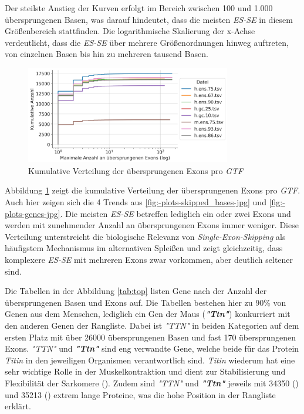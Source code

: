 \documentclass[12pt]{article}
\begin{document}
Der steilste Anstieg der Kurven erfolgt im Bereich zwischen 100 und 1.000 übersprungenen Basen, was darauf hindeutet,
dass die meisten \textit{ES-SE} in diesem Größenbereich stattfinden.
Die logarithmische Skalierung der x-Achse verdeutlicht, dass die \textit{ES-SE} über mehrere Größenordnungen hinweg auftreten,
von einzelnen Basen bis hin zu mehreren tausend Basen.

\begin{figure}[htpb]
	\centering
	\includegraphics[width=0.8\textwidth]{./plots/skipped_exons.jpg}
	\caption{Kumulative Verteilung der übersprungenen Exons pro \textit{GTF}}
	\label{fig:-plots-skipped_exons-jpg}
\end{figure}

Abbildung \ref{fig:-plots-skipped_exons-jpg} zeigt die kumulative Verteilung der übersprungenen Exons pro \textit{GTF}.
Auch hier zeigen sich die 4 Trends aus \ref{fig:-plots-skipped_bases-jpg} und \ref{fig:-plots-genes-jpg}.
Die meisten \textit{ES-SE} betreffen lediglich ein oder zwei Exons und werden mit zunehmender Anzahl an
übersprungenen Exons immer weniger.
Diese Verteilung unterstreicht die biologische Relevanz von \textit{Single-Exon-Skipping} als häufigstem Mechanismus im alternativen
Spleißen und zeigt gleichzeitig, dass komplexere \textit{ES-SE} mit mehreren Exons zwar vorkommen,
aber deutlich seltener sind.

Die Tabellen in der Abbildung \ref{tab:top} listen Gene nach der Anzahl der übersprungenen Basen und Exons auf.
Die Tabellen bestehen hier zu 90\% von Genen aus dem Menschen, lediglich ein Gen der Maus (\textbf{\textit{"Ttn"}}) konkurriert mit den 
anderen Genen der Rangliste. Dabei ist \textit{"TTN"} in beiden Kategorien auf dem ersten Platz mit über 26000 übersprungenen Basen und fast 
170 übersprungenen Exons. \textit{"TTN"} und \textbf{\textit{"Ttn"}} sind eng verwandte Gene, welche beide für das Protein \textit{Titin} in den 
jeweiligen Organismen verantwortlich sind. \textit{Titin} wiederum hat eine sehr wichtige Rolle in der 
Muskelkontraktion und dient zur Stabilisierung und Flexibilität der Sarkomere (\cite{uniprot_titin}). Zudem
sind \textit{"TTN"} und \textbf{\textit{"Ttn"}} jeweils mit 34350 (\cite{uniprot_TTN}) und 35213 (\cite{uniprot_Ttn}) extrem lange Proteine,
was die hohe Position in der Rangliste erklärt.
\end{document}
